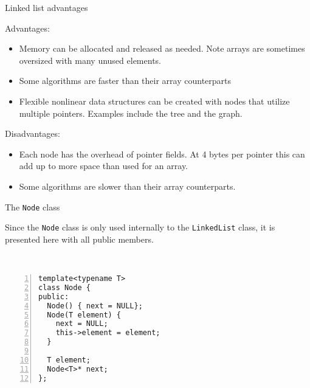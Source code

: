 \documentclass{beamer}
\begin{document}

\begin{frame}[fragile]{Linked list advantages}

Advantages:

\begin{itemize}
\item Memory can be allocated and released as needed. Note arrays are
  sometimes oversized with many unused elements.
\item Some algorithms are faster than their array counterparts
\item Flexible nonlinear data structures can be created with nodes
  that utilize multiple pointers. Examples include the tree and the
  graph.
\end{itemize}

\pause

Disadvantages:

\begin{itemize}
\item Each node has the overhead of pointer fields.  At 4 bytes per
  pointer this can add up to more space than used for an array.
\item Some algorithms are slower than their array counterparts.
\end{itemize}


\end{frame}



\begin{frame}[fragile]{The \lstinline$Node$ class}

Since the \lstinline$Node$ class is only used internally to the \lstinline$LinkedList$
  class, it is presented here with all public members.

~\\

\begin{lstlisting}[numbers=left]
template<typename T>
class Node {
public:
  Node() { next = NULL};
  Node(T element) {
    next = NULL;
    this->element = element;
  }

  T element;
  Node<T>* next;
};
\end{lstlisting}

\end{frame}

\end{document}
